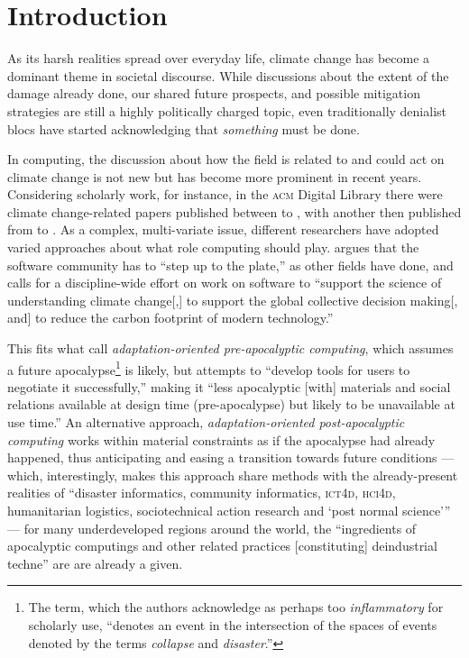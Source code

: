 \section{Introduction}

As its harsh realities spread %
over everyday life, climate change has become a dominant theme in societal discourse. While discussions about the extent of the damage already done, our shared future prospects, and possible mitigation strategies are still a highly politically charged topic, even traditionally denialist blocs have started acknowledging that \emph{something} must be done. \cite{teirstein_2021} 

In computing, the discussion about how the field is related to and could act on climate change is not new but has become more prominent in recent years. Considering scholarly work, for instance, in the \textsc{acm} Digital Library there were  climate change-related papers published between  to , with another  then published from  to . \cite{ferreiraClimateChangeCommunication2021} As a complex, multi-variate issue, different researchers have adopted varied approaches about what role computing should play. \citet{easterbrook2010climate} argues that the software community has to ``step up to the plate,'' as other fields have done, and calls for a discipline-wide effort on work on software to ``support the science of understanding climate change[,] to support the global collective decision making[, and] to reduce the carbon footprint of modern technology.''

This fits what \citet{silberman2010precarious} call \emph{adaptation-oriented pre-apocalyptic computing}, which assumes a future apocalypse\footnote{The term, which the authors acknowledge as perhaps too \emph{inflammatory} for scholarly use, ``denotes an event in the intersection of the spaces of events denoted by the terms \emph{collapse} and \emph{disaster}.''} is likely, but attempts to ``develop tools for users to negotiate it successfully,'' making it ``less apocalyptic [with] materials and social relations available at design time (pre-apocalypse) but likely to be unavailable at use time.'' An alternative approach, \emph{adaptation-oriented post-apocalyptic computing} works within material constraints as if the apocalypse had already happened, thus anticipating and easing a transition towards future conditions --- which, interestingly, makes this approach share methods with the already-present realities of ``disaster informatics, community informatics, \textsc{ict4d}, \textsc{hci4d}, humanitarian logistics, sociotechnical action research and `post normal science''' --- for many underdeveloped regions around the world, the ``ingredients of apocalyptic computings and other related practices [constituting] deindustrial techne'' are are already a given.

